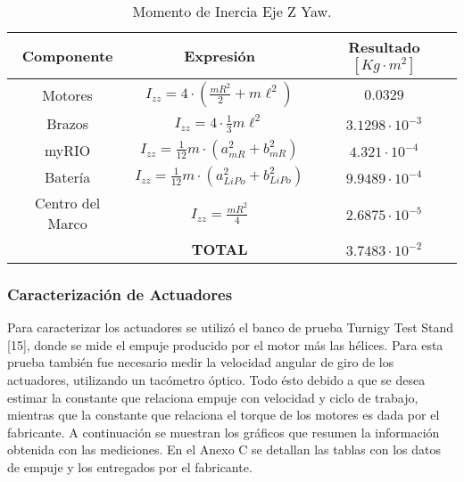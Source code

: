 \documentclass[\main/main.tex]{subfiles}
\begin{document}
\begin{table}[H]
\noindent \begin{centering}
\begin{tabular}{|c|c|c|}
\hline 
\textbf{Componente } & \textbf{Expresión} & \textbf{Resultado $[Kg\cdot m^2]$}\tabularnewline
\hline 
\hline 
Motores & $I_{zz}=4\cdot(\frac{mR^{2}}{2}+m\ell^{2})$ & $0.0329$\tabularnewline
\hline 
Brazos & $I_{zz}=4\cdot\frac{1}{3}m\ell^{2}$ & $3.1298\cdot10^{-3}$\tabularnewline
\hline 
myRIO & $I_{zz}=\frac{1}{12}m\cdot(a_{mR}^{2}+b_{mR}^{2})$ & $4.321\cdot10^{-4}$\tabularnewline
\hline 
Batería & $I_{zz}=\frac{1}{12}m\cdot(a_{LiPo}^{2}+b_{LiPo}^{2})$ & $9.9489\cdot10^{-4}$\tabularnewline
\hline 
Centro del Marco & $I_{zz}=\frac{mR^{2}}{4}$ & $2.6875\cdot10^{-5}$\tabularnewline
\hline 
\multicolumn{1}{c|}{} & \textbf{TOTAL} & $3.7483\cdot10^{-2}$\tabularnewline
\cline{2-3} 
\end{tabular}
\par\end{centering}
\caption{Momento de Inercia Eje Z Yaw.}
\end{table}

\subsubsection{Caracterización de Actuadores}

Para caracterizar los actuadores se utilizó el banco de prueba Turnigy
Test Stand [15], donde se mide el empuje producido por el motor más las
hélices. Para esta prueba también fue necesario medir la velocidad
angular de giro de los actuadores, utilizando un tacómetro óptico.
Todo ésto debido a que se desea estimar la constante que relaciona
empuje con velocidad y ciclo de trabajo, mientras que la constante
que relaciona el torque de los motores es dada por el fabricante.
A continuación se muestran los gráficos que resumen la información
obtenida con las mediciones. En el Anexo C se detallan
las tablas con los datos de empuje y los entregados por el fabricante.

\textcompwordmark{}
\end{document}

